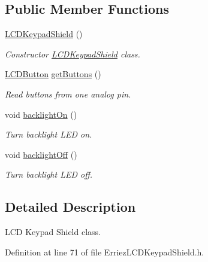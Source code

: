 \subsection*{Public Member Functions}
\begin{DoxyCompactItemize}
\item 
\hyperlink{class_l_c_d_keypad_shield_ad26ce3a3a5c3300f0af024149bf87bb4}{L\+C\+D\+Keypad\+Shield} ()
\begin{DoxyCompactList}\small\item\em Constructor \hyperlink{class_l_c_d_keypad_shield}{L\+C\+D\+Keypad\+Shield} class. \end{DoxyCompactList}\item 
\hyperlink{_erriez_l_c_d_keypad_shield_8h_a024ede13291704606f2369e2d8798b1d}{L\+C\+D\+Button} \hyperlink{class_l_c_d_keypad_shield_ad8660e937c391344b3520d7610d7a3dc}{get\+Buttons} ()
\begin{DoxyCompactList}\small\item\em Read buttons from one analog pin. \end{DoxyCompactList}\item 
void \hyperlink{class_l_c_d_keypad_shield_abbdc6a191e247e5b8a12fe5d73b6431c}{backlight\+On} ()\hypertarget{class_l_c_d_keypad_shield_abbdc6a191e247e5b8a12fe5d73b6431c}{}\label{class_l_c_d_keypad_shield_abbdc6a191e247e5b8a12fe5d73b6431c}

\begin{DoxyCompactList}\small\item\em Turn backlight L\+ED on. \end{DoxyCompactList}\item 
void \hyperlink{class_l_c_d_keypad_shield_a7fcbbc1f3793be56707860e6892343fc}{backlight\+Off} ()\hypertarget{class_l_c_d_keypad_shield_a7fcbbc1f3793be56707860e6892343fc}{}\label{class_l_c_d_keypad_shield_a7fcbbc1f3793be56707860e6892343fc}

\begin{DoxyCompactList}\small\item\em Turn backlight L\+ED off. \end{DoxyCompactList}\end{DoxyCompactItemize}


\subsection{Detailed Description}
L\+CD Keypad Shield class. 

Definition at line 71 of file Erriez\+L\+C\+D\+Keypad\+Shield.\+h.



